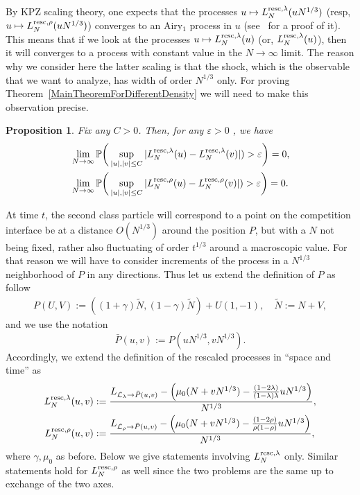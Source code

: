 \documentclass[12pt,a4paper]{article}
\numberwithin{equation}{section}
\newcommand{\Pb}{\mathbb{P}}
\newcommand{\e}{\varepsilon}
\newtheorem{prop}{Proposition}[section]
\begin{document}
By KPZ scaling theory, one expects that the processes $u\mapsto L^{{\rm resc},\lambda}_{N}(uN^{1/3})$ (resp, $u\mapsto L^{{\rm resc},\rho}_{N}(uN^{1/3})$) converges to an Airy$_1$ process in $u$ (see~\cite{FO17v1} for a proof of it). This means that if we look at the processes $u\mapsto L^{{\rm resc},\lambda}_{N}(u)$ (or, $ L^{{\rm resc},\lambda}_{N}(u)$), then it will converges to a process with constant value in the $N\to\infty$ limit. The reason why we consider here the latter scaling is that the shock, which is the observable that we want to analyze, has width of order $N^{1/3}$ only. For proving Theorem~\ref{MainTheoremForDifferentDensity} we will need to make this observation precise.

\begin{prop}\label{Tightness}
Fix any $C>0$. Then, for any $\e>0$ , we have
\begin{align}\label{eq:LimitOfModulus}
&\lim_{N\to \infty}\Pb\bigg(\sup_{|u|,|v|\leq C}|L^{{\rm resc},\lambda}_{N}(u)-L^{{\rm resc},\lambda}_{N}(v)|) >\e\bigg)= 0, \\
&\lim_{N\to \infty}\Pb\bigg(\sup_{|u|,|v|\leq C}|L^{{\rm resc},\rho}_{N}(u)-L^{{\rm resc},\rho}_{N}(v)|) >\e\bigg)= 0.
\end{align}
\end{prop}

At time $t$, the second class particle will correspond to a point on the competition interface be at a distance $O(N^{1/3})$ around the position $P$, but with a $N$ not being fixed, rather also fluctuating of order $t^{1/3}$ around a macroscopic value. For that reason we will have to consider increments of the process in a $N^{1/3}$ neighborhood of $P$ in any directions. Thus let us extend the definition of $P$ as follow
\begin{align}\label{eq:ExtendDef}
P(U,V):= \left((1+\gamma)\tilde{N}, (1-\gamma)\tilde{N} \right)+U(1,-1) , \quad \tilde{N}:= N+V,
\end{align}
and we use the notation
\begin{equation}
\bar{P}(u,v):=P(uN^{1/3},vN^{1/3}).
\end{equation}
Accordingly, we extend the definition of the rescaled processes in ``space and time'' as
\begin{equation}\label{eqRescProcessesSpaceTime}
\begin{aligned}
 L^{{\rm resc},\lambda}_{N}(u,v)&:= \frac{L_{{\cal L}_{\lambda}\to \bar P(u,v)}-\left(\mu_0 (N+vN^{1/3}) - \frac{(1-2\lambda)}{(1-\lambda)\lambda}uN^{1/3}\right)}{N^{1/3}},\\
 L^{{\rm resc},\rho}_{N}(u,v) & := \frac{L_{{\cal L}_{\rho}\to \bar P(u,v)}- \left(\mu_0 (N+vN^{1/3}) - \frac{(1-2\rho)}{\rho(1-\rho)}uN^{1/3}\right)}{N^{1/3}},
 \end{aligned}
\end{equation}
where $\gamma,\mu_0$ as before. Below we give statements involving $L^{{\rm resc},\lambda}_{N}$ only. Similar statements hold for $L^{{\rm resc},\rho}_{N}$ as well since the two problems are the same up to exchange of the two axes.
\end{document}
